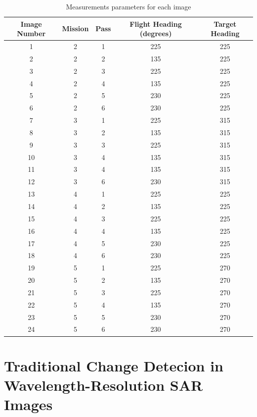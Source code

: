 \begin{table}[H]
    \centering
    \begin{tabular}{|c|c|c|c|c|}
        \hline
        Image Number & Mission & Pass & Flight Heading (degrees) & Target Heading \\ \hline
        1 & 2 & 1 & 225 & 225  \\ \hline
        2 & 2 & 2 & 135 & 225  \\ \hline
        3 & 2 & 3 & 225 & 225  \\ \hline
        4 & 2 & 4 & 135 & 225 \\ \hline
        5 & 2 & 5 & 230 & 225 \\ \hline
        6 & 2 & 6 & 230 & 225 \\ \hline
        7 & 3 & 1 & 225 & 315 \\ \hline
        8 & 3 & 2 & 135 & 315 \\ \hline
        9 & 3 & 3 & 225 & 315 \\ \hline
        10 & 3 & 4 & 135 & 315 \\ \hline
        11 & 3 & 4 & 135 & 315 \\ \hline
        12& 3 & 6 & 230 & 315  \\ \hline
        13 & 4 & 1 & 225 & 225  \\ \hline
        14 & 4 & 2 & 135 & 225  \\ \hline
        15 & 4 & 3 & 225 & 225  \\ \hline
        16 & 4 & 4 & 135 & 225  \\ \hline
        17 & 4 & 5 & 230 & 225  \\ \hline
        18 & 4 & 6 & 230& 225 \\ \hline
        19 & 5 & 1 & 225 & 270  \\ \hline
        20 & 5 & 2 & 135 & 270  \\ \hline
        21 & 5 & 3 & 225 & 270  \\ \hline
        22 & 5 & 4 & 135 & 270  \\ \hline
        23 & 5 & 5 & 230 & 270  \\ \hline
        24 & 5 & 6 & 230 & 270  \\ \hline
    \end{tabular}
    \caption{Measurements parameters for each image}
    \label{tab:flight_mission}
\end{table}

\section{Traditional Change Detecion in Wavelength-Resolution SAR Images}

